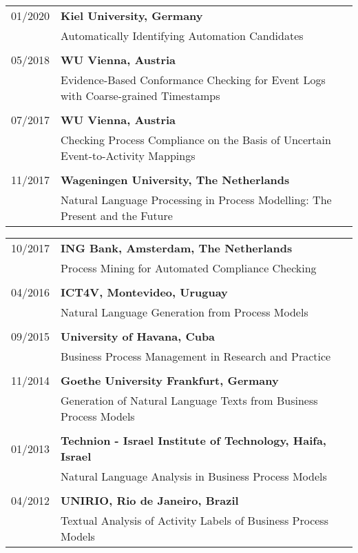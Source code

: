\raggedright
\begin{tabular}{P{3cm}P{12cm}}

01/2020		& \textbf{Kiel University, Germany} \\
					& Automatically Identifying Automation Candidates \\
					\\
05/2018		& 	\textbf{WU Vienna, Austria} \\
					& Evidence-Based Conformance Checking for Event Logs with Coarse-grained Timestamps \\
					\\
07/2017		& \textbf{WU Vienna, Austria} \\
					& Checking Process Compliance on the Basis of Uncertain Event-to-Activity Mappings \\
					\\
11/2017		& \textbf{Wageningen University, The Netherlands} \\
					& Natural Language Processing in Process Modelling: The Present and the Future \\
								\end{tabular}
\begin{tabular}{P{3cm}P{12cm}}					
10/2017		& \textbf{ING Bank, Amsterdam, The Netherlands} \\
					& Process Mining for Automated Compliance Checking \\
					\\
04/2016		& \textbf{ICT4V, Montevideo, Uruguay} \\
					& Natural Language Generation from Process Models \\
					\\
09/2015		& \textbf{University of Havana, Cuba} \\
					& Business Process Management in Research and Practice \\
					\\
11/2014		& \textbf{Goethe University Frankfurt, Germany} \\
					& Generation of Natural Language Texts from Business Process Models \\
					\\
01/2013		& \textbf{Technion - Israel Institute of Technology, Haifa, Israel} \\
					& Natural Language Analysis in Business Process Models \\
					\\
04/2012		& \textbf{UNIRIO, Rio de Janeiro, Brazil} \\
					& Textual Analysis of Activity Labels of Business Process Models \\
\end{tabular}
